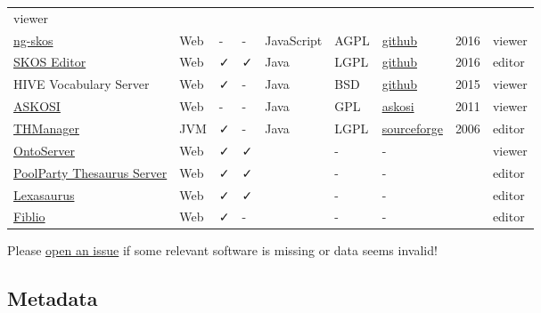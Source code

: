 \documentclass[
  DIV=10]{article}
\begin{document}
\begin{longtable}[]{@{}lllllllll@{}}
viewer \\
\href{http://gbv.github.io/ng-skos/}{ng-skos} & Web & - & - & JavaScript
& AGPL & \href{https://github.com/gbv/ng-skos}{github} & 2016 &
viewer \\
\href{https://jbiomedsem.biomedcentral.com/articles/10.1186/s13326-015-0043-z}{SKOS
Editor} & Web & ✓ & ✓ & Java & LGPL &
\href{https://github.com/Blulab-Utah/SKOSEditor}{github} & 2016 &
editor \\
HIVE Vocabulary Server & Web & ✓ & - & Java & BSD &
\href{https://github.com/MetadataResearchCenter/hive-mrc}{github} & 2015
& viewer \\
\href{http://www.askosi.org/}{ASKOSI} & Web & - & - & Java & GPL &
\href{http://www.askosi.org/example/}{askosi} & 2011 & viewer \\
\href{https://thmanager.sourceforge.io/}{THManager} & JVM & ✓ & - & Java
& LGPL & \href{https://sourceforge.net/projects/thmanager/}{sourceforge}
& 2006 & editor \\
\href{https://ontoserver.csiro.au/}{OntoServer} & Web & ✓ & ✓ & & - & -
& & viewer \\
\href{https://www.poolparty.biz/poolparty-thesaurus-manager}{PoolParty
Thesaurus Server} & Web & ✓ & ✓ & & - & - & & editor \\
\href{http://www.k-int.com/products/lexaurus/}{Lexasaurus} & Web & ✓ & ✓
& & - & - & & editor \\
\href{https://www.fiblio.de/}{Fiblio} & Web & ✓ & - & & - & - & &
editor \\
\end{longtable}

Please
\href{https://github.com/gbv/bartoc-vocabulary-software/issues}{open an
issue} if some relevant software is missing or data seems invalid!

\newpage
{}
\recalctypearea

\subsection{Metadata}\label{metadata}
\end{document}
